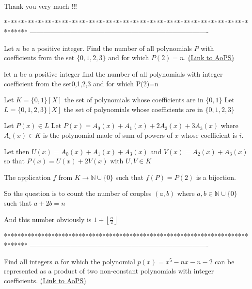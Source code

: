 \begin{solution}
	Thank you very much !!! 
\end{solution}
*******************************************************************************
-------------------------------------------------------------------------------

\begin{problem}
	Let $n$ be a positive integer. Find the number of all polynomials $P$ with coefficients from the set $\{0,1,2,3\}$ and for which $P(2)=n$.
	\flushright \href{https://artofproblemsolving.com/community/c6h374597}{(Link to AoPS)}
\end{problem}



\begin{solution}
	\begin{tcolorbox}let n be a positive integer find the number of all polynomials with integer coefficient from the set{0,1,2,3} and for which P(2)=n\end{tcolorbox}
Let $K=\{0,1\}[X]$ the set of polynomials whose coefficients are in $\{0,1\}$
Let $L=\{0,1,2,3\}[X]$ the set of polynomials whose coefficients are in $\{0,1,2,3\}$

Let $P(x)\in L$
Let $P(x)=A_0(x)+A_1(x)+2A_2(x)+3A_3(x)$ where $A_i(x)\in K$ is the polynomial made of sum of powers of $x$ whose coefficient is $i$.

Let then $U(x)=A_0(x)+A_1(x)+A_3(x)$ and $V(x)=A_2(x)+A_3(x)$ so that $P(x)=U(x)+2V(x)$ with $U,V\in K$

The application $f$ from $K\to\mathbb N\cup\{0\}$ such that $f(P)=P(2)$ is a bijection.

So the question is to count the number of couples $(a,b)$ where $a,b\in\mathbb N\cup\{0\}$ such that $a+2b=n$

And this number obviously is $\boxed{1+\left\lfloor\frac n2\right\rfloor}$
\end{solution}
*******************************************************************************
-------------------------------------------------------------------------------

\begin{problem}
	Find all integers $n$ for which the polynomial $p(x) = x^5 -nx -n -2$ can be represented as a product of two non-constant polynomials with integer coefficients.
	\flushright \href{https://artofproblemsolving.com/community/c6h375027}{(Link to AoPS)}
\end{problem}



